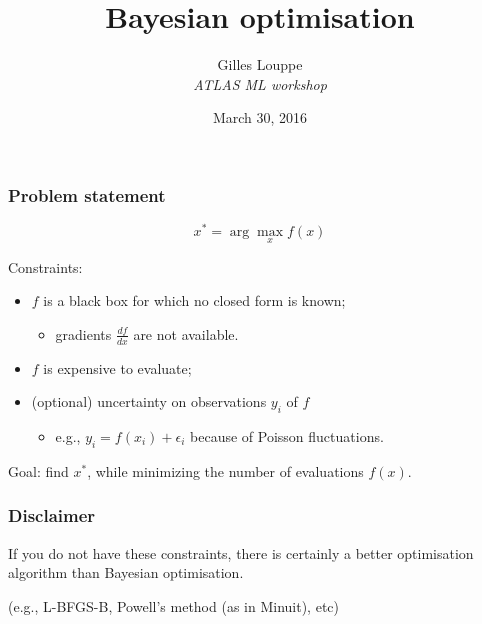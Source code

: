\documentclass{beamer}
\title{{\bf Bayesian optimisation}}
\author{
Gilles Louppe\\
{\it ATLAS ML workshop}
}
\date{March 30, 2016}
\begin{document}
\begin{frame}[plain]
\titlepage
\end{frame}

\begin{frame}
    \frametitle{Problem statement}

    \begin{center}
        $$x^* = \arg \max_x f(x)$$
    \end{center}

    \vspace{2em}

    Constraints:
    \begin{itemize}
        \item $f$ is a black box for which no closed form is known;
            \begin{itemize}
                \item gradients $\frac{df}{dx}$ are not available.
            \end{itemize}

        \item $f$ is expensive to evaluate;

        \item (optional) uncertainty on observations $y_i$ of $f$
            \begin{itemize}
                \item e.g., $y_i = f(x_i) + \epsilon_i$ because of Poisson fluctuations.
            \end{itemize}
    \end{itemize}

    \vspace{2em}

    Goal: find $x^*$, while minimizing the number of evaluations $f(x)$.
\end{frame}

\begin{frame}
    \frametitle{\color{red} Disclaimer}
    \begin{center}
        If you do not have these constraints, there is certainly a better optimisation algorithm than Bayesian optimisation.

        \vspace{3em}

        (e.g., L-BFGS-B, Powell's method (as in Minuit), etc)
    \end{center}
\end{frame}
\end{document}
